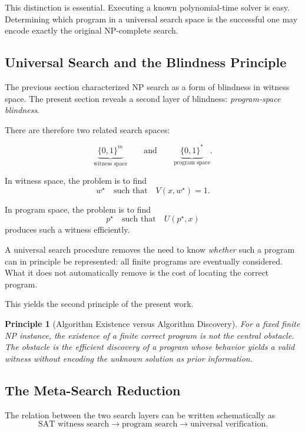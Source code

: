 \documentclass[11pt]{article}
\theoremstyle{plain}
\newtheorem{principle}[theorem]{Principle}
\theoremstyle{definition}
\begin{document}
This distinction is essential.  Executing a known polynomial-time solver is
easy.  Determining which program in a universal search space is the successful
one may encode exactly the original NP-complete search.

\subsection{Universal Search and the Blindness Principle}

The previous section characterized NP search as a form of blindness in
witness space.  The present section reveals a second layer of blindness:
\emph{program-space blindness}.

There are therefore two related search spaces:

\[
    \underbrace{\{0,1\}^{m}}_{\text{witness space}}
    \qquad\text{and}\qquad
    \underbrace{\{0,1\}^{\ast}}_{\text{program space}}.
\]

In witness space, the problem is to find
\[
    w^\star
    \quad\text{such that}\quad
    V(x,w^\star)=1.
\]

In program space, the problem is to find
\[
    p^\star
    \quad\text{such that}\quad
    U(p^\star,x)
\]
produces such a witness efficiently.

A universal search procedure removes the need to know \emph{whether} such a
program can in principle be represented: all finite programs are eventually
considered.  What it does not automatically remove is the cost of locating
the correct program.

This yields the second principle of the present work.

\begin{principle}[Algorithm Existence versus Algorithm Discovery]
\label{principle:existence-discovery}
For a fixed finite NP instance, the existence of a finite correct program is
not the central obstacle.  The obstacle is the efficient discovery of a
program whose behavior yields a valid witness without encoding the unknown
solution as prior information.
\end{principle}

\subsection{The Meta-Search Reduction}

The relation between the two search layers can be written schematically as
\[
    \boxed{
    \text{SAT witness search}
    \longrightarrow
    \text{program search}
    \longrightarrow
    \text{universal verification}
    }.
\]
\end{document}
